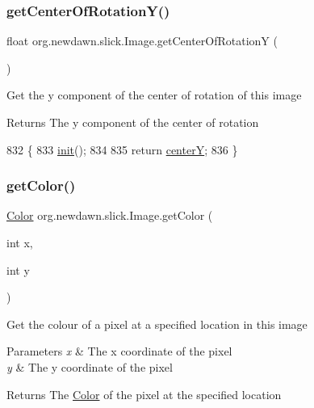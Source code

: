 \subsubsection{\texorpdfstring{get\+Center\+Of\+Rotation\+Y()}{getCenterOfRotationY()}}
{\footnotesize\ttfamily float org.\+newdawn.\+slick.\+Image.\+get\+Center\+Of\+RotationY (\begin{DoxyParamCaption}{ }\end{DoxyParamCaption})\hspace{0.3cm}{\ttfamily [inline]}}

Get the y component of the center of rotation of this image

\begin{DoxyReturn}{Returns}
The y component of the center of rotation 
\end{DoxyReturn}

\begin{DoxyCode}
832                                         \{
833         \mbox{\hyperlink{classorg_1_1newdawn_1_1slick_1_1_image_a94d180c9218ba1444a0496a1898ec345}{init}}();
834         
835         \textcolor{keywordflow}{return} \mbox{\hyperlink{classorg_1_1newdawn_1_1slick_1_1_image_a3935c6eead627c8aa8667985fc314496}{centerY}};
836     \}
\end{DoxyCode}
\mbox{\label{classorg_1_1newdawn_1_1slick_1_1_image_ab3b87f64ff6c9c413a7f0a016ba0693c}} 
\subsubsection{\texorpdfstring{get\+Color()}{getColor()}}
{\footnotesize\ttfamily \mbox{\hyperlink{classorg_1_1newdawn_1_1slick_1_1_color}{Color}} org.\+newdawn.\+slick.\+Image.\+get\+Color (\begin{DoxyParamCaption}\item[{int}]{x,  }\item[{int}]{y }\end{DoxyParamCaption})\hspace{0.3cm}{\ttfamily [inline]}}

Get the colour of a pixel at a specified location in this image


\begin{DoxyParams}{Parameters}
{\em x} & The x coordinate of the pixel \\
\hline
{\em y} & The y coordinate of the pixel \\
\hline
\end{DoxyParams}
\begin{DoxyReturn}{Returns}
The \mbox{\hyperlink{classorg_1_1newdawn_1_1slick_1_1_color}{Color}} of the pixel at the specified location 
\end{DoxyReturn}

